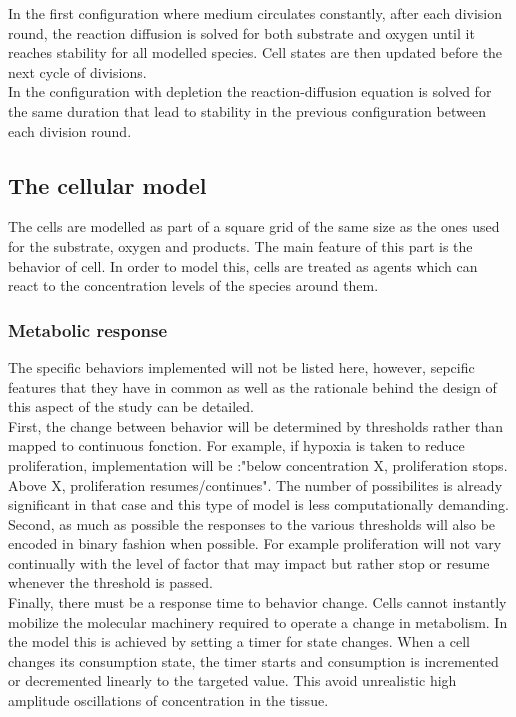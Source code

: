\documentclass[11pt,a4paper]{article}
\begin{document}
In the first configuration where medium circulates constantly, after each division round, the reaction diffusion is solved for both substrate and oxygen until it reaches stability for all modelled species. Cell states are then updated before the next cycle of divisions.\\

In the configuration with depletion the reaction-diffusion equation is solved for the same duration that lead to stability in the previous configuration between each division round.\\


\subsection{The cellular model}
The cells are modelled as part of a square grid of the same size as the ones used for the substrate, oxygen and products. The main feature of this part is the behavior of cell. In order to model this, cells  are treated as agents which can react to the concentration levels of the species around them.\\

\subsubsection{Metabolic response}
The specific behaviors implemented will not be listed here, however, sepcific features that they have in common as well as the rationale  behind the design of this aspect of the study can be detailed. \\

First, the change between behavior will be determined by thresholds rather than mapped to continuous fonction. For example, if hypoxia is taken to reduce proliferation, implementation will be :"below concentration X, proliferation stops. Above X, proliferation resumes/continues". The number of possibilites is already significant in that case and this type of model is less computationally demanding.\\

Second, as much as possible the responses to the various thresholds will also be encoded in binary fashion when possible. For example proliferation will not vary continually with the level of factor that may impact but rather stop or resume whenever the threshold is passed.\\

Finally, there must be a response time to behavior change. Cells cannot instantly mobilize the molecular machinery required to operate a change in metabolism. In the model this is achieved by setting a timer for state changes. When a cell changes its consumption state, the timer starts and consumption is incremented or decremented linearly to the targeted value. This avoid unrealistic high amplitude oscillations of concentration in the tissue.
 
\end{document}
